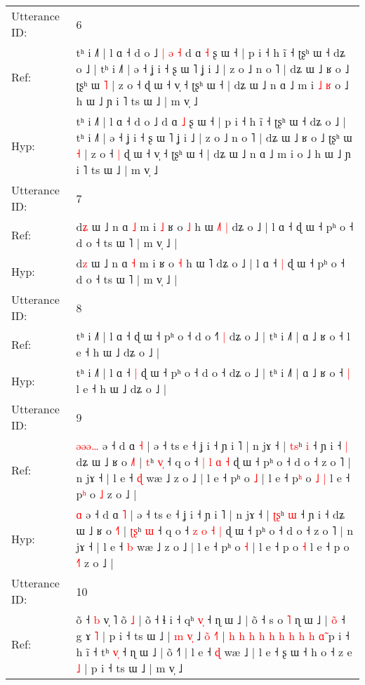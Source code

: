 \documentclass[10pt]{article}
\DeclareRobustCommand{\hl}[1]{{\textcolor{red}{#1}}}
\begin{document}
\begin{longtable}{ll}
 \\
\midrule
Utterance ID: & 6 \\
Ref: & tʰ i ˩˥ | l ɑ ˧ d o ˩\hl{ }\hl{|}\hl{ }\hl{ə}\hl{ }\hl{˧} d ɑ \hl{˧} ʂ ɯ ˧ | p i ˧ h ĩ ˧ ʈʂʰ ɯ ˧ dʑ o ˩ | tʰ i ˩˥ | ə ˧ ʝ i ˧ ʂ ɯ ˥ ʝ i ˩ | z o ˩ n o ˥ | dʑ ɯ ˩ ʁ o ˩ ʈʂʰ ɯ \hl{˥} | z o ˧\hl{}\hl{} ɖ ɯ ˧ v̩ ˧ ʈʂʰ ɯ ˧ | dʑ ɯ ˩ n ɑ ˩ m i\hl{ }\hl{˩}\hl{ }\hl{ʁ} o ˩ h ɯ ˩ ɲ i ˥ ts ɯ ˩ | m v̩ ˩
 \\
Hyp: & tʰ i ˩˥ | l ɑ ˧ d o ˩\hl{}\hl{}\hl{}\hl{}\hl{}\hl{} d ɑ \hl{˩} ʂ ɯ ˧ | p i ˧ h ĩ ˧ ʈʂʰ ɯ ˧ dʑ o ˩ | tʰ i ˩˥ | ə ˧ ʝ i ˧ ʂ ɯ ˥ ʝ i ˩ | z o ˩ n o ˥ | dʑ ɯ ˩ ʁ o ˩ ʈʂʰ ɯ \hl{˧} | z o ˧\hl{ }\hl{|} ɖ ɯ ˧ v̩ ˧ ʈʂʰ ɯ ˧ | dʑ ɯ ˩ n ɑ ˩ m i\hl{}\hl{}\hl{}\hl{} o ˩ h ɯ ˩ ɲ i ˥ ts ɯ ˩ | m v̩ ˩
 \\
\midrule
Utterance ID: & 7 \\
Ref: & d\hl{ʑ} ɯ ˩ n ɑ \hl{˩} m i\hl{ }\hl{˩} ʁ o \hl{˩} h ɯ \hl{˩}˥\hl{ }\hl{|} dʑ o ˩ | l ɑ ˧\hl{}\hl{} ɖ ɯ ˧ pʰ o ˧ d o ˧ ts ɯ ˥ | m v̩ ˩ |
 \\
Hyp: & d\hl{z} ɯ ˩ n ɑ \hl{˧} m i\hl{}\hl{} ʁ o \hl{˧} h ɯ \hl{}˥\hl{}\hl{} dʑ o ˩ | l ɑ ˧\hl{ }\hl{|} ɖ ɯ ˧ pʰ o ˧ d o ˧ ts ɯ ˥ | m v̩ ˩ |
 \\
\midrule
Utterance ID: & 8 \\
Ref: & tʰ i ˩˥ | l ɑ ˧\hl{}\hl{} ɖ ɯ ˧ pʰ o ˧ d o ˧\hl{˥}\hl{ }\hl{|} dʑ o ˩ | tʰ i ˩˥ | ɑ ˩ ʁ o ˧\hl{}\hl{} l e ˧ h ɯ ˩ dʑ o ˩ |
 \\
Hyp: & tʰ i ˩˥ | l ɑ ˧\hl{ }\hl{|} ɖ ɯ ˧ pʰ o ˧ d o ˧\hl{}\hl{}\hl{} dʑ o ˩ | tʰ i ˩˥ | ɑ ˩ ʁ o ˧\hl{ }\hl{|} l e ˧ h ɯ ˩ dʑ o ˩ |
 \\
\midrule
Utterance ID: & 9 \\
Ref: & \hl{ə}\hl{ə}\hl{ə}\hl{…} ə ˧ d ɑ \hl{˧} | ə ˧ ts e ˧ ʝ i ˧ ɲ i ˥ | n jɤ ˧ | \hl{t}\hl{s}ʰ \hl{i} ˧ ɲ i ˧\hl{ }\hl{|} dʑ ɯ ˩ ʁ o \hl{˩}˥ | \hl{}\hl{t}ʰ \hl{v}\hl{̩} ˧ q o ˧ \hl{|} \hl{l} \hl{ɑ} \hl{˧} ɖ ɯ ˧ pʰ o ˧ d o ˧ z o ˥ | n jɤ ˧ | l e ˧ \hl{ɖ} wæ ˩ z o ˩ | l e ˧ pʰ o \hl{˩} | l e ˧ p\hl{ʰ} o\hl{ }\hl{˩} \hl{|} l e ˧ p\hl{ʰ} o \hl{}\hl{˩} z o ˩ |
 \\
Hyp: & \hl{}\hl{}\hl{}\hl{ɑ} ə ˧ d ɑ \hl{˥} | ə ˧ ts e ˧ ʝ i ˧ ɲ i ˥ | n jɤ ˧ | \hl{ʈ}\hl{ʂ}ʰ \hl{ɯ} ˧ ɲ i ˧\hl{}\hl{} dʑ ɯ ˩ ʁ o \hl{˧}˥ | \hl{ʈ}\hl{ʂ}ʰ \hl{}\hl{ɯ} ˧ q o ˧ \hl{z} \hl{o} \hl{˧} \hl{|} ɖ ɯ ˧ pʰ o ˧ d o ˧ z o ˥ | n jɤ ˧ | l e ˧ \hl{b} wæ ˩ z o ˩ | l e ˧ pʰ o \hl{˧} | l e ˧ p\hl{} o\hl{}\hl{} \hl{˧} l e ˧ p\hl{} o \hl{˧}\hl{˥} z o ˩ |
 \\
\midrule
Utterance ID: & 10 \\
Ref: & õ ˧ \hl{b} v̩ ˥ õ \hl{˩} | õ ˧ ɬ i ˧ qʰ \hl{v}\hl{̩} ˧ ɳ ɯ ˩ | o\hl{̃} ˧ s o \hl{˥} ɳ ɯ ˩ | \hl{}\hl{o}\hl{̃} ˧ g ɤ \hl{˥} | p i ˧ ts\hl{} ɯ ˩ |\hl{ }\hl{m}\hl{ }\hl{v}\hl{̩} ˩\hl{ }\hl{o}\hl{̃}\hl{ }\hl{˧}\hl{˥} |\hl{ }\hl{h}\hl{ }\hl{h}\hl{ }\hl{h}\hl{ }\hl{h}\hl{ }\hl{h}\hl{ }\hl{h} \hl{h}\hl{ }\hl{h} \hl{h} \hl{ɑ}\hl{̃} p i ˧ h ĩ ˧ tʰ \hl{v}\hl{̩} ˧ ɳ ɯ ˩ | õ\hl{}\hl{} ˧˥ | l e ˧ \hl{ɖ} wæ ˩ | l e ˧ ʂ ɯ ˧ h o ˧ z e \hl{˩} | p i ˧ ts ɯ ˩ | m v̩ ˩

\end{longtable}
\end{document}
